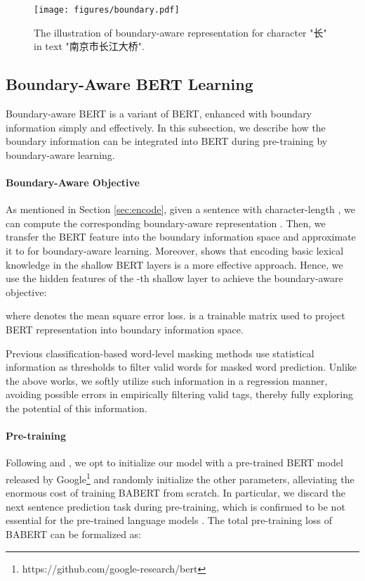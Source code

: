 \documentclass[11pt]{article}
\begin{document}
\begin{CJK}{UTF8}{gbsn}
\begin{figure}
  \centering
  \texttt{[image: figures/boundary.pdf]}
  \caption{The illustration of boundary-aware representation for character "长" in text "南京市长江大桥".}
  \label{fig:boundary}
\end{figure}

\subsection{Boundary-Aware BERT Learning}
\label{sec:bound-learning}
Boundary-aware BERT is a variant of BERT, enhanced with boundary information simply and effectively.
In this subsection, we describe how the boundary information can be integrated into BERT during pre-training by boundary-aware learning.



\paragraph{Boundary-Aware Objective}


As mentioned in Section \ref{sec:encode}, given a sentence  with character-length , we can compute the corresponding boundary-aware representation .
Then, we transfer the BERT feature into the boundary information space and approximate it to  for boundary-aware learning.
Moreover, \citet{liu-etal-2021-lexicon} shows that encoding basic lexical knowledge in the shallow BERT layers is a more effective approach.
Hence, we use the hidden features  of the -th shallow layer to achieve the boundary-aware objective:

where  denotes the mean square error loss.
 is a trainable matrix used to project BERT representation into boundary information space.


Previous classification-based word-level masking methods use statistical information as thresholds to filter valid words for masked word prediction.
Unlike the above works, we softly utilize such information in a regression manner,
avoiding possible errors in empirically filtering valid tags,
thereby fully exploring the potential of this information.



\paragraph{Pre-training}
Following \citet{jia-etal-2020-entity} and \citet{gao-callan-2021-condenser},
we opt to initialize our model with a pre-trained BERT model released by Google\footnote{https://github.com/google-research/bert}
and randomly initialize the other parameters,
alleviating the enormous cost of training BABERT from scratch.
In particular, we discard the next sentence prediction task during pre-training, which is confirmed to be not essential for the pre-trained language models \cite{lan2019albert, liu2019roberta}.
The total pre-training loss of BABERT can be formalized as:


\end{CJK}
\end{document}
